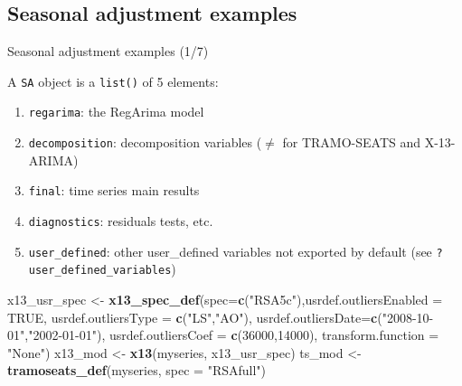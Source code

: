 \documentclass[10pt,xcolor=table,color={dvipsnames,usenames},ignorenonframetext,usepdftitle=false,french]{beamer}
\newenvironment{Shaded}{\begin{snugshade}}{\end{snugshade}}
\newcommand{\KeywordTok}[1]{\textcolor[rgb]{0.13,0.29,0.53}{\textbf{#1}}}
\newcommand{\DataTypeTok}[1]{\textcolor[rgb]{0.13,0.29,0.53}{#1}}
\newcommand{\DecValTok}[1]{\textcolor[rgb]{0.00,0.00,0.81}{#1}}
\newcommand{\StringTok}[1]{\textcolor[rgb]{0.31,0.60,0.02}{#1}}
\newcommand{\OtherTok}[1]{\textcolor[rgb]{0.56,0.35,0.01}{#1}}
\newcommand{\NormalTok}[1]{#1}
\providecommand{\tightlist}{%
  \setlength{\parskip}{0pt}
  }
\begin{document}
\subsection{Seasonal adjustment
examples}\label{seasonal-adjustment-examples}

\begin{frame}[fragile]{Seasonal adjustment examples (1/7)}

A \texttt{SA} object is a \texttt{list()} of 5 elements:

\begin{enumerate}
\def\labelenumi{\arabic{enumi}.}
\tightlist
\item
  \texttt{regarima}: the RegArima model
\item
  \texttt{decomposition}: decomposition variables (\(\ne\) for
  TRAMO-SEATS and X-13-ARIMA)
\item
  \texttt{final}: time series main results
\item
  \texttt{diagnostics}: residuals tests, etc.
\item
  \texttt{user\_defined}: other user\_defined variables not exported by
  default (see \texttt{?user\_defined\_variables})
\end{enumerate}

\footnotesize

\begin{Shaded}
\begin{Highlighting}[]
\NormalTok{x13_usr_spec <-}\StringTok{ }\KeywordTok{x13_spec_def}\NormalTok{(}\DataTypeTok{spec=}\KeywordTok{c}\NormalTok{(}\StringTok{"RSA5c"}\NormalTok{),}\DataTypeTok{usrdef.outliersEnabled =} \OtherTok{TRUE}\NormalTok{,}
                             \DataTypeTok{usrdef.outliersType =} \KeywordTok{c}\NormalTok{(}\StringTok{"LS"}\NormalTok{,}\StringTok{"AO"}\NormalTok{),}
                             \DataTypeTok{usrdef.outliersDate=}\KeywordTok{c}\NormalTok{(}\StringTok{"2008-10-01"}\NormalTok{,}\StringTok{"2002-01-01"}\NormalTok{),}
                             \DataTypeTok{usrdef.outliersCoef =} \KeywordTok{c}\NormalTok{(}\DecValTok{36000}\NormalTok{,}\DecValTok{14000}\NormalTok{),}
                             \DataTypeTok{transform.function =} \StringTok{"None"}\NormalTok{)}
\NormalTok{x13_mod <-}\StringTok{ }\KeywordTok{x13}\NormalTok{(myseries, x13_usr_spec)}
\NormalTok{ts_mod <-}\StringTok{ }\KeywordTok{tramoseats_def}\NormalTok{(myseries, }\DataTypeTok{spec =} \StringTok{"RSAfull"}\NormalTok{)}
\end{Highlighting}
\end{Shaded}

\end{frame}
\end{document}
